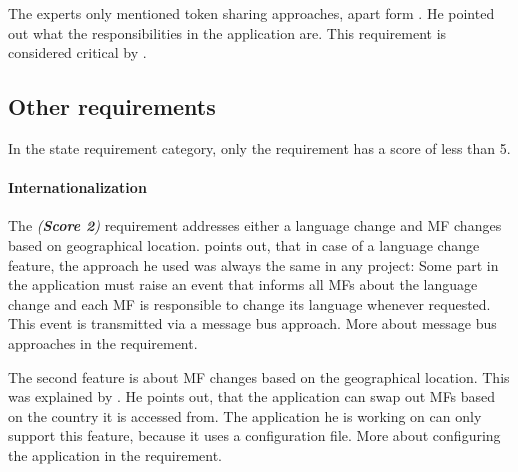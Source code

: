 The experts only mentioned token sharing approaches, apart form \textcite{Laug.2018}.
He pointed out what the responsibilities in the application are.
This requirement is considered critical by \textciteSteyer{}.





\subsection{Other requirements}

In the state requirement category, only the \textit{} requirement has a score of less than 5.

\paragraph{Internationalization}\label{cha:requirement_detail_state_internationalization}

The \textit{ (\textbf{Score 2})} requirement addresses either a language change and \ac{MF} changes based on geographical location.
\textciteSteyer{} points out, that in case of a language change feature, the approach he used was always the same in any project:
Some part in the application must raise an event that informs all \acp{MF} about the language change and each \ac{MF} is responsible to change its language whenever requested.
This event is transmitted via a message bus approach.
More about message bus approaches in the \textit{} requirement.

The second feature is about \ac{MF} changes based on the geographical location.
This was explained by \textciteMezzalira{}.
He points out, that the application can swap out \acp{MF} based on the country it is accessed from.
The application he is working on can only support this feature, because it uses a configuration file.
More about configuring the application in the \textit{} requirement.
